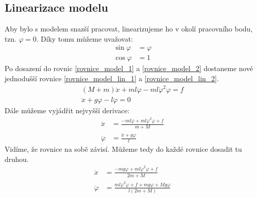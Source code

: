 \documentclass[a4paper, 12pt]{article}
\begin{document}
		\subsection{Linearizace modelu}
			Aby bylo s modelem snazší pracovat, linearizujeme ho v okolí pracovního bodu, tzn. $\varphi = 0$. Díky tomu můžeme uvažovat:
			\begin{align*}
				\sin\varphi &= \varphi\\
				\cos\varphi	&= 1
			\end{align*}
			Po dosazení do rovnic \ref{rovnice_model_1} a \ref{rovnice_model_2} dostaneme nové jednodušší rovnice \ref{rovnice_model_lin_1} a \ref{rovnice_model_lin_2}.
			\begin{align}
				\left(M+m\right)\ddot{x}+ml\ddot{\varphi}-ml\dot{\varphi}^2\varphi = f
				\label{rovnice_model_lin_1}\\
				\ddot{x}+g\varphi-l\ddot{\varphi} = 0
			    \label{rovnice_model_lin_2}
			\end{align}
			Dále můžeme vyjádřit nejvyšší derivace:
			\begin{align*}
				\ddot{x}&=\frac{-ml\ddot{\varphi}+ml\dot{\varphi}^2\varphi+f}{m+M}\\
				\ddot{\varphi}&=\frac{\ddot{x}+g\varphi}{l}
			\end{align*}
			Vidíme, že rovnice na sobě závisí. Můžeme tedy do každé rovnice dosadit tu druhou.
			\begin{align*}
				\ddot{x}&=\frac{-mg\varphi+ml\dot{\varphi}^2\varphi+f}{2m+M}\\
				\ddot{\varphi}&=\frac{ml\dot{\varphi}^2\varphi+f+mg\varphi+Mg\varphi}{l\left(2m+M\right)}
			\end{align*}
		
\end{document}
